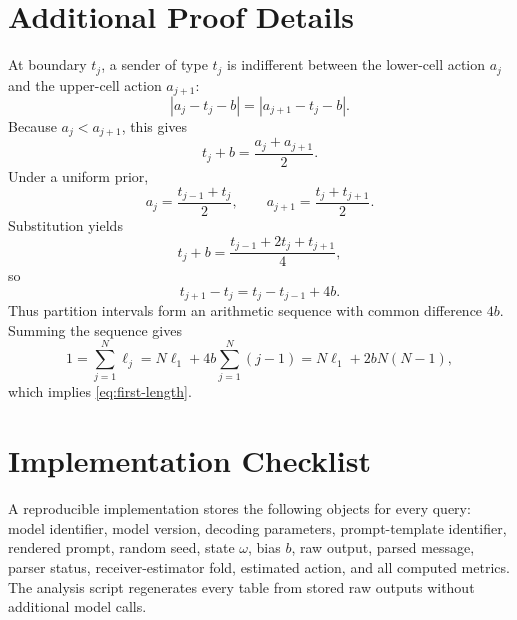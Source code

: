 \documentclass[11pt]{article}
\begin{document}
\section{Additional Proof Details}\label{app:proofs}

At boundary $t_j$, a sender of type $t_j$ is indifferent between the lower-cell action $a_j$ and the upper-cell action $a_{j+1}$:
\begin{equation}
    |a_j-t_j-b|=|a_{j+1}-t_j-b|.
\end{equation}
Because $a_j<a_{j+1}$, this gives
\begin{equation}
    t_j+b=\frac{a_j+a_{j+1}}{2}.
\end{equation}
Under a uniform prior,
\begin{equation}
    a_j=\frac{t_{j-1}+t_j}{2},\qquad a_{j+1}=\frac{t_j+t_{j+1}}{2}.
\end{equation}
Substitution yields
\begin{equation}
    t_j+b=\frac{t_{j-1}+2t_j+t_{j+1}}{4},
\end{equation}
so
\begin{equation}
    t_{j+1}-t_j=t_j-t_{j-1}+4b.
\end{equation}
Thus partition intervals form an arithmetic sequence with common difference $4b$.  Summing the sequence gives
\begin{equation}
    1=\sum_{j=1}^N\ell_j=N\ell_1+4b\sum_{j=1}^N(j-1)=N\ell_1+2bN(N-1),
\end{equation}
which implies \eqref{eq:first-length}.

\section{Implementation Checklist}\label{app:checklist}

A reproducible implementation stores the following objects for every query: model identifier, model version, decoding parameters, prompt-template identifier, rendered prompt, random seed, state $\omega$, bias $b$, raw output, parsed message, parser status, receiver-estimator fold, estimated action, and all computed metrics.  The analysis script regenerates every table from stored raw outputs without additional model calls.
\end{document}
